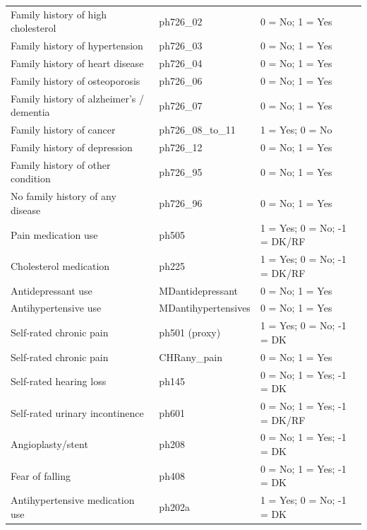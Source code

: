 \begin{longtable}{p{7cm} p{3cm} p{4cm}}
Family history of high cholesterol & ph726\_02 & 0 = No; 1 = Yes \\
Family history of hypertension & ph726\_03 & 0 = No; 1 = Yes \\
Family history of heart disease & ph726\_04 & 0 = No; 1 = Yes \\
Family history of osteoporosis & ph726\_06 & 0 = No; 1 = Yes \\
Family history of alzheimer's / dementia & ph726\_07 & 0 = No; 1 = Yes \\
Family history of cancer & ph726\_08\_to\_11 & 1 = Yes; 0 = No \\
Family history of depression & ph726\_12 & 0 = No; 1 = Yes \\
Family history of other condition & ph726\_95 & 0 = No; 1 = Yes \\
No family history of any disease & ph726\_96 & 0 = No; 1 = Yes \\
Pain medication use & ph505 & 1 = Yes; 0 = No; -1 = DK/RF \\
Cholesterol medication & ph225 & 1 = Yes; 0 = No; -1 = DK/RF \\
Antidepressant use & MDantidepressant & 0 = No; 1 = Yes \\
Antihypertensive use & MDantihypertensives & 0 = No; 1 = Yes \\
Self-rated chronic pain & ph501 (proxy) & 1 = Yes; 0 = No; -1 = DK \\
Self-rated chronic pain & CHRany\_pain & 0 = No; 1 = Yes \\
Self-rated hearing loss & ph145 & 0 = No; 1 = Yes; -1 = DK \\
Self-rated urinary incontinence & ph601 & 0 = No; 1 = Yes; -1 = DK/RF \\
Angioplasty/stent & ph208 & 0 = No; 1 = Yes; -1 = DK \\
Fear of falling & ph408 & 0 = No; 1 = Yes; -1 = DK \\
Antihypertensive medication use & ph202a & 1 = Yes; 0 = No; -1 = DK \\

\end{longtable}